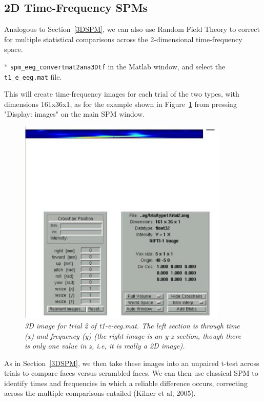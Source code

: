 \subsection{2D Time-Frequency SPMs}

Analogous to Section~\ref{3DSPM}, we can also use Random Field Theory to correct for multiple statistical comparisons across the 2-dimensional time-frequency space.

* \verb!spm_eeg_convertmat2ana3Dtf! in the Matlab window, and select the \verb!t1_e_eeg.mat! file.

This will create time-frequency images for each trial of the two types, with dimensions 161x36x1, as for the example shown in Figure~\ref{fig_32_15} from pressing "Display: images" on the main SPM window.

\begin{figure}
\begin{center}
\includegraphics[width=100mm]{multimodal/figures/figure_32_15}
\caption{\em  3D image for trial 2 of t1-e-eeg.mat. The left section is through time (x) and frequency (y) (the right image is an y-z section, though there is only one value in z, i.e, it is really a 2D image).\label{fig_32_15}}
\end{center}
\end{figure}

As in Section~\ref{3DSPM}, we then take these images into an unpaired t-test across trials to compare faces versus scrambled faces. We can then use classical SPM to identify times and frequencies in which a reliable difference occurs, correcting across the multiple comparisons entailed (Kilner et al, 2005).

